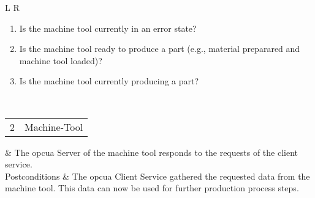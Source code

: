 \documentclass[
a4paper,
twoside,
headsepline,
cleardoublepage=empty,
parskip=half,
draft=false
]{scrbook}
\begin{document}
\begin{table}[htbp]
\begin{tabular}{L R}
\begin{enumerate}
							\item Is the machine tool currently in an error state?
							\item Is the machine tool ready to produce a part (e.g., material preparared and machine tool loaded)?
							\item Is the machine tool currently producing a part?
						\end{enumerate}
						\\ \midrule
						\begin{tabular}{c c} 2 & Machine-Tool \end{tabular} & The \gls{opcua} Server of the machine tool responds to the requests of the client service.
						\\ \midrule
						Postconditions & The \gls{opcua} Client Service gathered the requested data from the machine tool. This data can now be used for further production process steps.
						\\ \bottomrule
					\end{tabular}
				\end{table}
\end{document}

